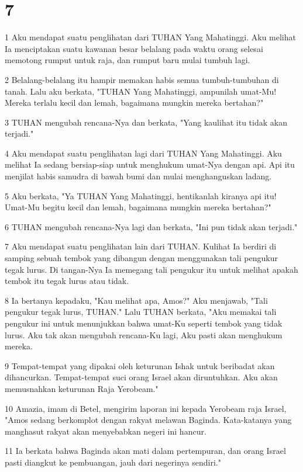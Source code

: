 \chapter{7}

\par 1 Aku mendapat suatu penglihatan dari TUHAN Yang Mahatinggi. Aku melihat Ia menciptakan suatu kawanan besar belalang pada waktu orang selesai memotong rumput untuk raja, dan rumput baru mulai tumbuh lagi.
\par 2 Belalang-belalang itu hampir memakan habis semua tumbuh-tumbuhan di tanah. Lalu aku berkata, "TUHAN Yang Mahatinggi, ampunilah umat-Mu! Mereka terlalu kecil dan lemah, bagaimana mungkin mereka bertahan?"
\par 3 TUHAN mengubah rencana-Nya dan berkata, "Yang kaulihat itu tidak akan terjadi."
\par 4 Aku mendapat suatu penglihatan lagi dari TUHAN Yang Mahatinggi. Aku melihat Ia sedang bersiap-siap untuk menghukum umat-Nya dengan api. Api itu menjilat habis samudra di bawah bumi dan mulai menghanguskan ladang.
\par 5 Aku berkata, "Ya TUHAN Yang Mahatinggi, hentikanlah kiranya api itu! Umat-Mu begitu kecil dan lemah, bagaimana mungkin mereka bertahan?"
\par 6 TUHAN mengubah rencana-Nya lagi dan berkata, "Ini pun tidak akan terjadi."
\par 7 Aku mendapat suatu penglihatan lain dari TUHAN. Kulihat Ia berdiri di samping sebuah tembok yang dibangun dengan menggunakan tali pengukur tegak lurus. Di tangan-Nya Ia memegang tali pengukur itu untuk melihat apakah tembok itu tegak lurus atau tidak.
\par 8 Ia bertanya kepadaku, "Kau melihat apa, Amos?" Aku menjawab, "Tali pengukur tegak lurus, TUHAN." Lalu TUHAN berkata, "Aku memakai tali pengukur ini untuk menunjukkan bahwa umat-Ku seperti tembok yang tidak lurus. Aku tak akan mengubah rencana-Ku lagi, Aku pasti akan menghukum mereka.
\par 9 Tempat-tempat yang dipakai oleh keturunan Ishak untuk beribadat akan dihancurkan. Tempat-tempat suci orang Israel akan diruntuhkan. Aku akan memusnahkan keturunan Raja Yerobeam."
\par 10 Amazia, imam di Betel, mengirim laporan ini kepada Yerobeam raja Israel, "Amos sedang berkomplot dengan rakyat melawan Baginda. Kata-katanya yang manghasut rakyat akan menyebabkan negeri ini hancur.
\par 11 Ia berkata bahwa Baginda akan mati dalam pertempuran, dan orang Israel pasti diangkut ke pembuangan, jauh dari negerinya sendiri."
